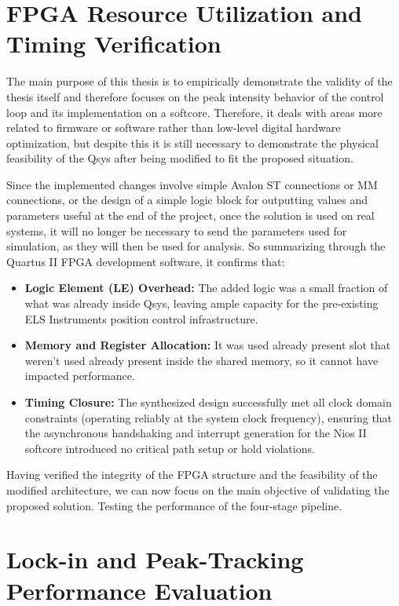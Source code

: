 \section{FPGA Resource Utilization and Timing Verification}

The main purpose of this thesis is to empirically demonstrate the validity of the thesis itself and therefore focuses on the peak intensity behavior of the control loop and its implementation on a softcore. 
Therefore, it deals with areas more related to firmware or software rather than low-level digital hardware optimization, but despite this it is still necessary to demonstrate the physical feasibility of the Qsys after being modified to fit the proposed situation.

Since the implemented changes involve simple Avalon ST connections or MM connections, or the design of a simple logic block for outputting values and parameters useful at the end of the project, once the solution is used on real systems, it will no longer be necessary to send the parameters used for simulation, as they will then be used for analysis.
So summarizing through the Quartus II FPGA development software, it confirms that:
\begin{itemize}
    \item \textbf{Logic Element (LE) Overhead:} The added logic was a small fraction of what was already inside Qsys, leaving ample capacity for the pre-existing ELS Instruments position control infrastructure.
    \item \textbf{Memory and Register Allocation:} It was used already present slot that weren't used already present inside the shared memory, so it cannot have impacted performance.
    \item \textbf{Timing Closure:} The synthesized design successfully met all clock domain constraints (operating reliably at the system clock frequency), ensuring that the asynchronous handshaking and interrupt generation for the Nios II softcore introduced no critical path setup or hold violations.
\end{itemize}

Having verified the integrity of the FPGA structure and the feasibility of the modified architecture, we can now focus on the main objective of validating the proposed solution.
Testing the performance of the four-stage pipeline.

\section{Lock-in and Peak-Tracking Performance Evaluation}

